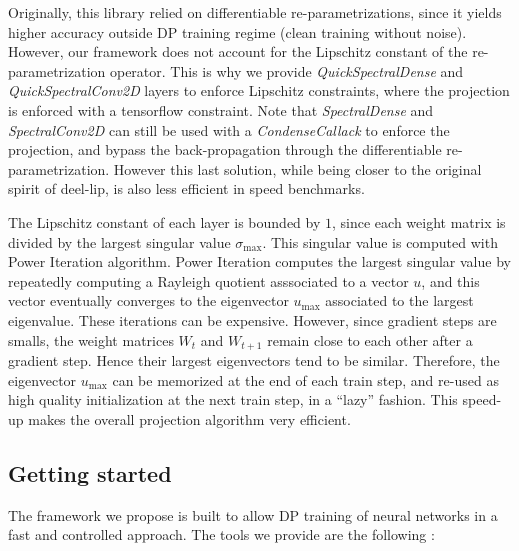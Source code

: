     Originally, this library relied on differentiable re-parametrizations, since it yields higher accuracy outside DP training regime (clean training without noise). However, our framework does not account for the Lipschitz constant of the re-parametrization operator. This is why we provide \textit{QuickSpectralDense} and \textit{QuickSpectralConv2D} layers to enforce Lipschitz constraints, where the projection is enforced with a tensorflow constraint. Note that \textit{SpectralDense} and \textit{SpectralConv2D} can still be used with a \textit{CondenseCallack} to enforce the projection, and bypass the back-propagation through the differentiable re-parametrization. However this last solution, while being closer to the original spirit of deel-lip, is also less efficient in speed benchmarks.  

    The Lipschitz constant of each layer is bounded by $1$, since each weight matrix is divided by the largest singular value $\sigma_{\text{max}}$. This singular value is computed with Power Iteration algorithm. Power Iteration computes the largest singular value by repeatedly computing a Rayleigh quotient asssociated to a vector $u$, and this vector eventually converges to the eigenvector $u_{\max}$ associated to the largest eigenvalue. These iterations can be expensive. However, since gradient steps are smalls, the weight matrices $W_t$ and $W_{t+1}$ remain close to each other after a gradient step. Hence their largest eigenvectors tend to be similar. Therefore, the eigenvector $u_{\max}$ can be memorized at the end of each train step, and re-used as high quality initialization at the next train step, in a ``lazy'' fashion. This speed-up makes the overall projection algorithm very efficient.   

\subsection{Getting started}

The framework we propose is built to allow DP training of neural networks in a fast and controlled approach. The tools we provide are the following :

